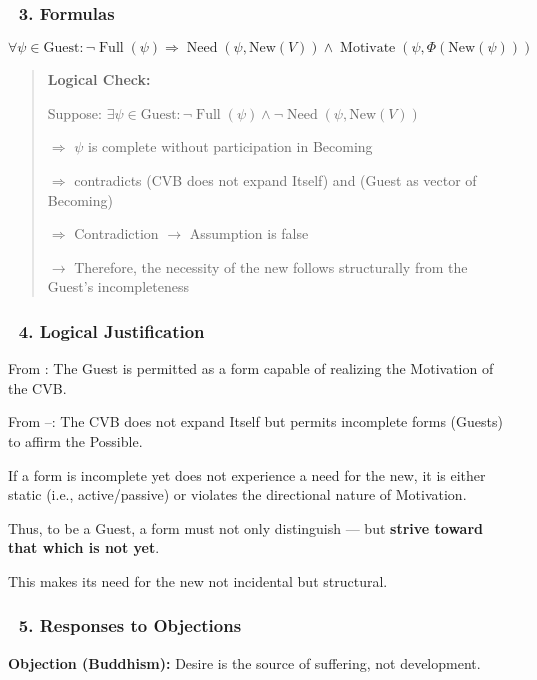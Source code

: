 \documentclass[12pt]{article}
\begin{document}
\subsubsection*{🔹 3. Formulas}

\[
\forall \psi \in \text{Guest}: \neg \operatorname{Full}(\psi) \Rightarrow \operatorname{Need}(\psi, \text{New}(V)) \wedge \operatorname{Motivate}(\psi, \Phi(\text{New}(\psi)))
\]

\begin{quote}
\textbf{Logical Check:}

Suppose: $\exists \psi \in \text{Guest}: \neg \operatorname{Full}(\psi) \wedge \neg \operatorname{Need}(\psi, \text{New}(V))$

$\Rightarrow$ $\psi$ is complete without participation in Becoming

$\Rightarrow$ contradicts \text{[13]} (CVB does not expand Itself) and \text{[17]} (Guest as vector of Becoming)

$\Rightarrow$ Contradiction $\rightarrow$ Assumption is false

$\rightarrow$ Therefore, the necessity of the new follows structurally from the Guest’s incompleteness
\end{quote}

\subsubsection*{🔹 4. Logical Justification}

From \text{[17]}: The Guest is permitted as a form capable of realizing the Motivation of the CVB.

From \text{[13]}–\text{[16]}: The CVB does not expand Itself but permits incomplete forms (Guests) to affirm the Possible.

If a form is incomplete yet does not experience a need for the new, it is either static (i.e., active/passive) or violates the directional nature of Motivation.

Thus, to be a Guest, a form must not only distinguish — but \textbf{strive toward that which is not yet}.

This makes its need for the new not incidental but structural.

\subsubsection*{🔹 5. Responses to Objections}

\textbf{Objection (Buddhism):} Desire is the source of suffering, not development.
\end{document}
